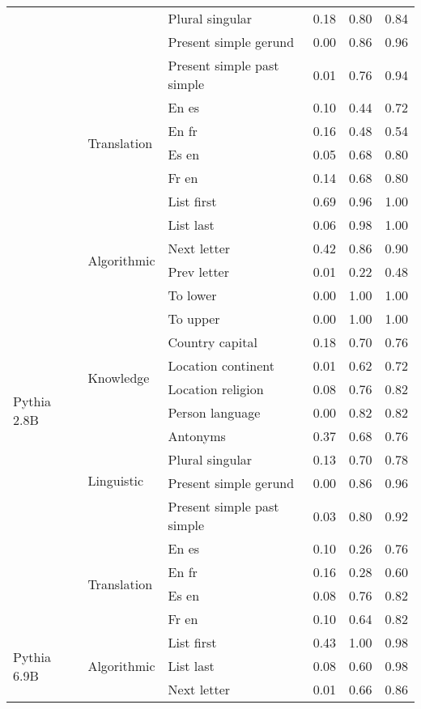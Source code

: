\begin{center}
\begin{longtable}{lllrrr}
 &  & Plural singular & 0.18 & 0.80 & 0.84 \\
 &  & Present simple gerund & 0.00 & 0.86 & 0.96 \\
 &  & Present simple past simple & 0.01 & 0.76 & 0.94 \\
\cline{2-6}
 & \multirow[t]{4}{*}{Translation} & En es & 0.10 & 0.44 & 0.72 \\
 &  & En fr & 0.16 & 0.48 & 0.54 \\
 &  & Es en & 0.05 & 0.68 & 0.80 \\
 &  & Fr en & 0.14 & 0.68 & 0.80 \\
\cline{1-6} \cline{2-6}
\multirow[t]{18}{*}{Pythia 2.8B} & \multirow[t]{6}{*}{Algorithmic} & List first & 0.69 & 0.96 & 1.00 \\
 &  & List last & 0.06 & 0.98 & 1.00 \\
 &  & Next letter & 0.42 & 0.86 & 0.90 \\
 &  & Prev letter & 0.01 & 0.22 & 0.48 \\
 &  & To lower & 0.00 & 1.00 & 1.00 \\
 &  & To upper & 0.00 & 1.00 & 1.00 \\
\cline{2-6}
 & \multirow[t]{4}{*}{Knowledge} & Country capital & 0.18 & 0.70 & 0.76 \\
 &  & Location continent & 0.01 & 0.62 & 0.72 \\
 &  & Location religion & 0.08 & 0.76 & 0.82 \\
 &  & Person language & 0.00 & 0.82 & 0.82 \\
\cline{2-6}
 & \multirow[t]{4}{*}{Linguistic} & Antonyms & 0.37 & 0.68 & 0.76 \\
 &  & Plural singular & 0.13 & 0.70 & 0.78 \\
 &  & Present simple gerund & 0.00 & 0.86 & 0.96 \\
 &  & Present simple past simple & 0.03 & 0.80 & 0.92 \\
\cline{2-6}
 & \multirow[t]{4}{*}{Translation} & En es & 0.10 & 0.26 & 0.76 \\
 &  & En fr & 0.16 & 0.28 & 0.60 \\
 &  & Es en & 0.08 & 0.76 & 0.82 \\
 &  & Fr en & 0.10 & 0.64 & 0.82 \\
\cline{1-6} \cline{2-6}
\multirow[t]{18}{*}{Pythia 6.9B} & \multirow[t]{6}{*}{Algorithmic} & List first & 0.43 & 1.00 & 0.98 \\
 &  & List last & 0.08 & 0.60 & 0.98 \\
 &  & Next letter & 0.01 & 0.66 & 0.86 \\

\end{longtable}
\end{center}

